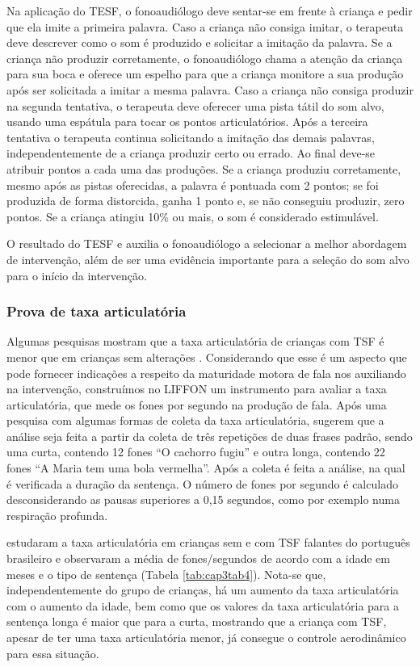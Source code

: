 \documentclass[output=paper,colorlinks,citecolor=brown,booklanguage=portuguese]{langscibook}
\begin{document}
Na aplicação do TESF, o fonoaudiólogo deve sentar-se em frente à criança e pedir que ela imite a primeira palavra. Caso a criança não consiga imitar, o terapeuta deve descrever como o som é produzido e solicitar a imitação da palavra. Se a criança não produzir corretamente, o fonoaudiólogo chama a atenção da criança para sua boca e oferece um espelho para que a criança monitore a sua produção após ser solicitada a imitar a mesma palavra. Caso a criança não consiga produzir na segunda tentativa, o terapeuta deve oferecer uma pista tátil do som alvo, usando uma espátula para tocar os pontos articulatórios. Após a terceira tentativa o terapeuta continua solicitando a imitação das demais palavras, independentemente de a criança produzir certo ou errado. Ao final deve-se atribuir pontos a cada uma das produções. Se a criança produziu corretamente, mesmo após as pistas oferecidas, a palavra é pontuada com 2 pontos; se foi produzida de forma distorcida, ganha 1 ponto e, se não conseguiu produzir, zero pontos. Se a criança atingiu 10\% ou mais, o som é considerado estimulável.

O resultado do TESF e auxilia o fonoaudiólogo a selecionar a melhor abordagem de intervenção, além de ser uma evidência importante para a seleção do som alvo para o início da intervenção.

\subsubsection{Prova de taxa articulatória}

Algumas pesquisas mostram que a taxa articulatória de crianças com TSF é menor que em crianças sem alterações \citep{Flipsen2002}. Considerando que esse é um aspecto que pode fornecer indicações a respeito da maturidade motora de fala nos auxiliando na intervenção, construímos no LIFFON um instrumento para avaliar a taxa articulatória, que mede os fones por segundo na produção de fala. Após uma pesquisa com algumas formas de coleta da taxa articulatória, \citet{Wertzner2009} sugerem que a análise seja feita a partir da coleta de três repetições de duas frases padrão, sendo uma curta, contendo 12 fones “O cachorro fugiu” e outra longa, contendo 22 fones “A Maria tem uma bola vermelha”.  Após a coleta é feita a análise, na qual é verificada a duração da sentença. O número de fones por segundo é calculado desconsiderando as pausas superiores a 0,15 segundos, como por exemplo numa respiração profunda. 

\citet{Francisco2016} estudaram a taxa articulatória em crianças sem e com TSF falantes do português brasileiro e observaram a média de fones/segundos de acordo com a idade em meses e o tipo de sentença (Tabela \ref{tab:cap3tab4}). Nota-se que, independentemente do grupo de crianças, há um aumento da taxa articulatória com o aumento da idade, bem como que os valores da taxa articulatória para a sentença longa é maior que para a curta, mostrando que a criança com TSF, apesar de ter uma taxa articulatória menor, já consegue o controle aerodinâmico para essa situação. 
\end{document}
